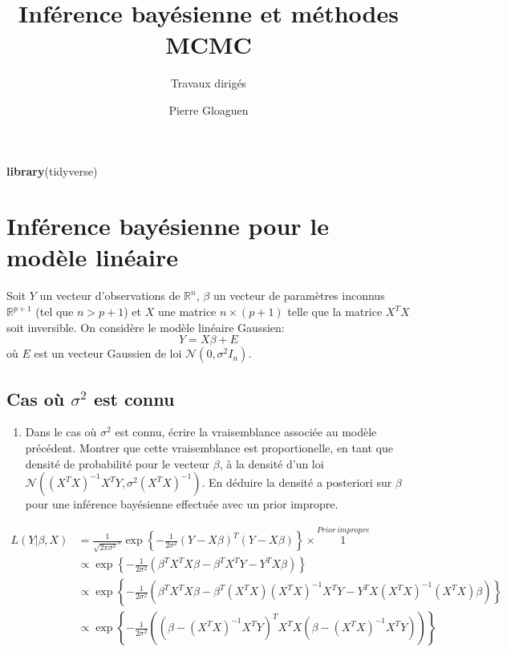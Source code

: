 \documentclass[]{article}
\title{Inférence bayésienne et méthodes MCMC}
\subtitle{Travaux dirigés}
\author{Pierre Gloaguen}
\date{}
\newenvironment{Shaded}{\begin{snugshade}}{\end{snugshade}}
\newcommand{\KeywordTok}[1]{\textcolor[rgb]{0.13,0.29,0.53}{\textbf{#1}}}
\newcommand{\NormalTok}[1]{#1}
\providecommand{\tightlist}{%
  \setlength{\itemsep}{0pt}\setlength{\parskip}{0pt}}
\newenvironment{Correction}%
  { \vspace{\baselineskip}\begin{mdframed}[backgroundcolor=my_green]}%
  {\end{mdframed}}
\begin{document}
\maketitle

\begin{Shaded}
\begin{Highlighting}[]
\KeywordTok{library}\NormalTok{(tidyverse)}
\end{Highlighting}
\end{Shaded}

\hypertarget{infuxe9rence-bayuxe9sienne-pour-le-moduxe8le-linuxe9aire}{%
\section{Inférence bayésienne pour le modèle
linéaire}\label{infuxe9rence-bayuxe9sienne-pour-le-moduxe8le-linuxe9aire}}

Soit \(Y\) un vecteur d'observations de \(\mathbb{R}^n\), \(\beta\) un
vecteur de paramètres inconnus \(\mathbb{R}^{p + 1}\) (tel que
\(n > p + 1\)) et \(X\) une matrice \(n \times (p +1)\) telle que la
matrice \(X^T X\) soit inversible. On considère le modèle linéaire
Gaussien: \[Y = X\beta + E\] où \(E\) est un vecteur Gaussien de loi
\(\mathcal{N}(0, \sigma^2I_n)\).

\hypertarget{cas-ouxf9-sigma2-est-connu}{%
\subsection{\texorpdfstring{Cas où \(\sigma^2\) est
connu}{Cas où \textbackslash{}sigma\^{}2 est connu}}\label{cas-ouxf9-sigma2-est-connu}}

\begin{enumerate}
\def\labelenumi{\arabic{enumi}.}
\tightlist
\item
  Dans le cas où \(\sigma^2\) est connu, écrire la vraisemblance
  associée au modèle précédent. Montrer que cette vraisemblance est
  proportionelle, en tant que densité de probabilité pour le vecteur
  \(\beta\), à la densité d'un loi
  \(\mathcal{N}((X^TX)^{-1}X^TY, \sigma^2 (X^TX)^{-1})\). En déduire la
  densité a posteriori sur \(\beta\) pour une inférence bayésienne
  effectuée avec un prior impropre.
\end{enumerate}

\begin{Correction}
\begin{align*}
L(Y\vert\beta, X) &= \frac{1}{\sqrt{2\pi\sigma^2}^n}\exp\left\lbrace-\frac{1}{2\sigma^2}\left(Y - X\beta\right)^T\left(Y - X\beta\right)\right\rbrace \times \overset{Prior~impropre}{1}\\
&\propto \exp\left\lbrace-\frac{1}{2\sigma^2}
\left(
\beta^TX^TX\beta - \beta^TX^TY - Y^TX\beta
\right)
\right\rbrace\\
&\propto \exp\left\lbrace-\frac{1}{2\sigma^2}
\left(
\beta^TX^TX\beta - \beta^T(X^TX)(X^TX)^{-1}X^TY - Y^TX(X^TX)^{-1}(X^TX)\beta
\right)
\right\rbrace\\
&\propto \exp\left\lbrace-\frac{1}{2\sigma^2}
\left(
(\beta - (X^TX)^{-1}X^TY)^TX^TX(\beta - (X^TX)^{-1}X^TY)
\right)
\right\rbrace
\end{align*}
\end{Correction}
\end{document}
